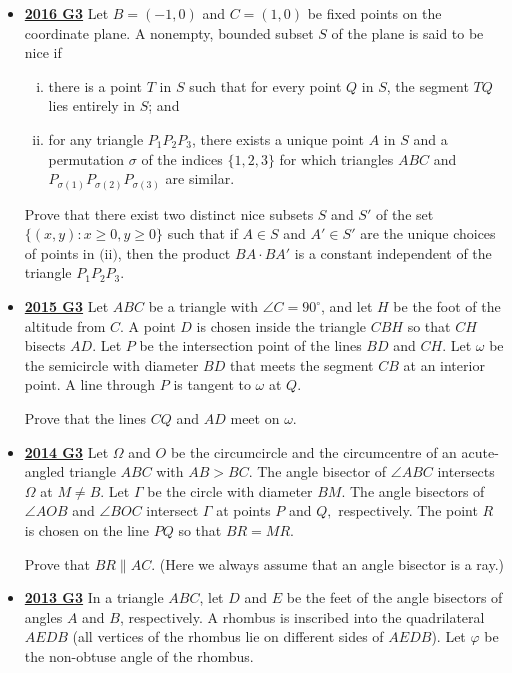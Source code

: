 \documentclass[11pt]{scrartcl}
\begin{document}
\begin{itemize}[leftmargin=*]
Prove that the circumcenter of triangle $PQH$ lies on a median of triangle $ABC$.

\item \href{https://artofproblemsolving.com/community/c6h1480713p8639302}{\textbf{2016 G3}} Let $B = (-1, 0)$ and $C = (1, 0)$ be fixed points on the coordinate plane. A nonempty, bounded subset $S$ of the plane is said to be nice if
\begin{enumerate}[(i)]
    \item there is a point $T$ in $S$ such that for every point $Q$ in $S$, the segment $TQ$ lies entirely in $S$; and
    \item for any triangle $P_1P_2P_3$, there exists a unique point $A$ in $S$ and a permutation $\sigma$ of the indices $\{1, 2, 3\}$ for which triangles $ABC$ and $P_{\sigma(1)}P_{\sigma(2)}P_{\sigma(3)}$ are similar.
\end{enumerate}
Prove that there exist two distinct nice subsets $S$ and $S'$ of the set $\{(x, y) : x \geqslant  0, y \geqslant  0\}$ such that if $A \in S$ and $A' \in S'$ are the unique choices of points in $\text{(ii)}$, then the product $BA \cdot BA'$ is a constant independent of the triangle $P_1P_2P_3$.
\item \href{https://artofproblemsolving.com/community/c6h1268851p6622204}{\textbf{2015 G3}} Let $ABC$ be a triangle with $\angle{C} = 90^{\circ}$, and let $H$ be the foot of the altitude from $C$. A point $D$ is chosen inside the triangle $CBH$ so that $CH$ bisects $AD$. Let $P$ be the intersection point of the lines $BD$ and $CH$. Let $\omega$ be the semicircle with diameter $BD$ that meets the segment $CB$ at an interior point. A line through $P$ is tangent to $\omega$ at $Q$. 

Prove that the lines $CQ$ and $AD$ meet on $\omega$.

\item \href{https://artofproblemsolving.com/community/c6h1113191p5083558}{\textbf{2014 G3}} Let $\Omega$ and $O$ be the circumcircle and the circumcentre of an acute-angled triangle $ABC$ with $AB > BC$. The angle bisector of $\angle ABC$ intersects $\Omega$ at $M \ne B$. Let $\Gamma$ be the circle with diameter $BM$. The angle bisectors of $\angle AOB$ and $\angle BOC$ intersect $\Gamma$ at points $P$ and $Q,$ respectively. The point $R$ is chosen on the line $P Q$ so that $BR = MR$. 

Prove that $BR\parallel AC$.
(Here we always assume that an angle bisector is a ray.)

\item \href{https://artofproblemsolving.com/community/c6h597239p3544090}{\textbf{2013 G3}} In a triangle $ABC$, let $D$ and $E$ be the feet of the angle bisectors of angles $A$ and $B$, respectively. A rhombus is inscribed into the quadrilateral $AEDB$ (all vertices of the rhombus lie on different sides of $AEDB$). Let $\varphi$ be the non-obtuse angle of the rhombus. 


\end{itemize}
\end{document}
